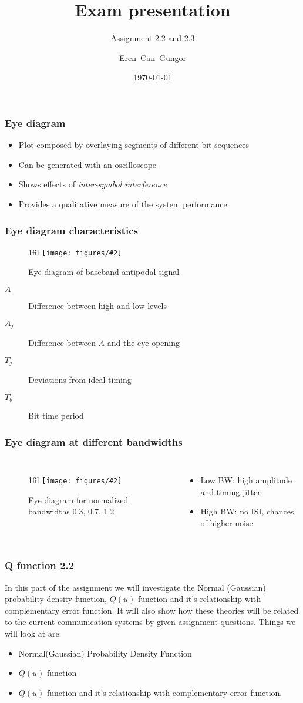 \documentclass{beamer}
\title{Exam presentation}
\subtitle{Assignment 2.2 and 2.3}
\author[Eren]{Eren~Can~Gungor\inst{1}}
\institute[DTU]
{
	\inst{1}
	Technical University of Denmark\\
	Digital Communication
}
\date{\today}
\makeatletter
\newcommand*{\centerfloat}{%
  \parindent \z@
  \leftskip \z@ \@plus 1fil \@minus \textwidth
  \rightskip\leftskip
  \parfillskip \z@skip}
\newcommand{\fig}[3]{
  \begin{figure}[H]
  \centerfloat
    \texttt{[image: figures/\#2]}
    \caption{#3}
  \end{figure}
}
\makeatother
\begin{document}
\frame{\titlepage}

\begin{frame}
	\frametitle{Eye diagram}
	\begin{itemize}
		\item Plot composed by overlaying segments of different bit sequences
		\item Can be generated with an oscilloscope
		\item Shows effects of \emph{inter-symbol interference}
		\item Provides a qualitative measure of the system performance
	\end{itemize}
\end{frame}

\begin{frame}
	\frametitle{Eye diagram characteristics}
	\fig{9cm}{eye1.png}{Eye diagram of baseband antipodal signal}
	\begin{description}
		\item[$A$] Difference between high and low levels
		\item[$A_j$] Difference between $A$ and the eye opening
		\item[$T_j$] Deviations from ideal timing
		\item[$T_b$] Bit time period
	\end{description}
\end{frame}

\begin{frame}
	\frametitle{Eye diagram at different bandwidths}
	\begin{columns}
			\fig{8cm}{eye2.png}{Eye diagram for normalized bandwidths 0.3, 0.7, 1.2}
			\begin{itemize}
				\item Low BW: high amplitude and timing jitter
				\item High BW: no ISI, chances of higher noise
			\end{itemize}
	\end{columns}
\end{frame}

\begin{frame}
	\frametitle{ Q function 2.2}
In this part of the assignment we will investigate the  Normal (Gaussian) probability density function, $Q(u)$ function and it's relationship with complementary error function. It will also show how these theories will be related to the current communication systems by given assignment questions. Things we will look at are:
	
	\begin{itemize}
		\item Normal(Gaussian) Probability Density Function
		\item $Q(u)$ function
		\item $Q(u)$ function and it's relationship with complementary error function.
	\end{itemize}
\end{frame}
\end{document}
